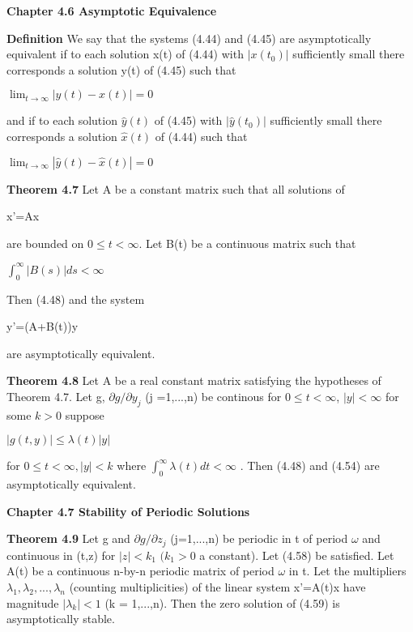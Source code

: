 \documentclass{article}
\begin{document}
\textbf {Chapter 4.6 Asymptotic Equivalence}

\textbf {Definition} We say that the systems (4.44) and (4.45) are asymptotically equivalent if to each solution x(t) of (4.44) with $|x(t_0)|$ sufficiently small there corresponds a solution y(t) of (4.45) such that
\begin{center}
$\lim_{t \to \infty} |y(t) - x(t)| = 0$
\end{center}
and if to each solution $\hat{y}(t)$ of (4.45) with $|\hat{y}(t_0)|$ sufficiently small there corresponds a solution $\hat{x}(t)$ of (4.44) such that
\begin{center}
$\lim_{t \to \infty} |\hat{y}(t)-\hat{x}(t)| = 0$
\end{center}

\textbf {Theorem 4.7} Let A be a constant matrix such that all solutions of
\begin{center}
x'=Ax
\end{center}
are bounded on $0 \leq t < \infty$. Let B(t) be a continuous matrix such that
\begin{center}
$\int_0^\infty |B(s)|ds < \infty$
\end{center}
Then (4.48) and the system
\begin{center}
y'=(A+B(t))y
\end{center}
are asymptotically equivalent.

\textbf {Theorem 4.8} Let A be a real constant matrix satisfying the hypotheses of Theorem 4.7. Let g, $\partial g / \partial y_j$ (j =1,...,n) be continous for $0 \leq t < \infty$, $|y| < \infty$ for some $k > 0$ suppose
\begin{center}
$|g(t,y)| \leq \lambda(t) |y|$
\end{center}
for $0 \leq t < \infty, |y| < k$ where $\int_0^\infty \lambda(t) dt< \infty$ . Then (4.48) and (4.54) are asymptotically equivalent.

\textbf {Chapter 4.7 Stability of Periodic Solutions}

\textbf {Theorem 4.9} Let g and $\partial g/ \partial z_j$ (j=1,...,n) be periodic in t of period $\omega$ and continuous in (t,z) for $|z| < k_1$ $(k_1 > 0$ a constant). Let (4.58) be satisfied. Let A(t) be a continuous n-by-n periodic matrix of period $\omega$ in t. Let the multipliers $\lambda_1, \lambda_2, ...,\lambda_n$ (counting multiplicities) of the linear system x'=A(t)x have magnitude $|\lambda_k| < 1$ (k = 1,...,n). Then the zero solution of (4.59) is asymptotically stable.
\end{document}
